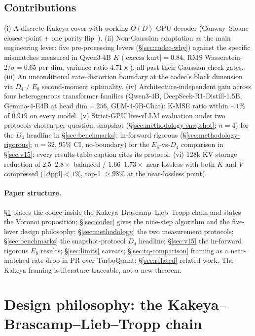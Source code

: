 \documentclass[10pt,a4paper]{article}
\theoremstyle{definition}
\theoremstyle{plain}
\begin{document}
\subsection{Contributions}

(i) A discrete Kakeya cover with working $O(D)$ GPU decoder
(Conway--Sloane closest-point + one parity
flip~\cite{conway-sloane-d4}). (ii) Non-Gaussian adaptation as the
main engineering lever: five pre-processing levers
(\S\ref{sec:codec-why}) against the specific mismatches measured
in Qwen3-4B $K$ ($|\text{excess kurt}|=0.84$, RMS
Wasserstein-$2/\sigma=0.65$ per dim, variance ratio $4.71\times$),
all past their Gaussian-check gates. (iii) An unconditional
rate--distortion boundary at the codec's block dimension via $D_4$
/ $E_8$ second-moment optimality. (iv) Architecture-independent
gain across four heterogeneous transformer families (Qwen3-4B,
DeepSeek-R1-Distill-1.5B, Gemma-4-E4B at
$\text{head\_dim}=256$, GLM-4-9B-Chat): K-MSE ratio within
$\sim\!1\%$ of $0.919$ on every model. (v) Strict-GPU live-vLLM
evaluation under two protocols chosen per question: snapshot
(\S\ref{sec:methodology-snapshot}; $n=4$) for the $D_4$ headline
in \S\ref{sec:benchmarks}; in-forward rigorous
(\S\ref{sec:methodology-rigorous}; $n=32$, $95\%$ CI,
no-boundary) for the $E_8$-vs-$D_4$ comparison in \S\ref{sec:v15};
every results-table caption cites its protocol. (vi) $128$k KV
storage reduction of $2.5$--$2.8\times$ balanced /
$1.66$--$1.73\times$ near-lossless with both $K$ and $V$
compressed ($|\Delta\mathrm{ppl}|<1\%$, top-1 $\geq 98\%$ at the
near-lossless point).

\paragraph{Paper structure.}
\S\ref{sec:framework} places the codec inside the
Kakeya--Brascamp--Lieb--Tropp chain and states the Voronoi
proposition; \S\ref{sec:codec} gives the nine-step algorithm and
the five-lever design philosophy; \S\ref{sec:methodology} the
two measurement protocols; \S\ref{sec:benchmarks} the
snapshot-protocol $D_4$ headline; \S\ref{sec:v15} the in-forward
rigorous $E_8$ results; \S\ref{sec:limits} caveats;
\S\ref{sec:tq-comparison} framing as a near-matched-rate drop-in
PR over TurboQuant; \S\ref{sec:related} related work. The Kakeya
framing is literature-traceable, not a new theorem.

\section{Design philosophy: the Kakeya--Brascamp--Lieb--Tropp chain}
\label{sec:framework}
\end{document}
